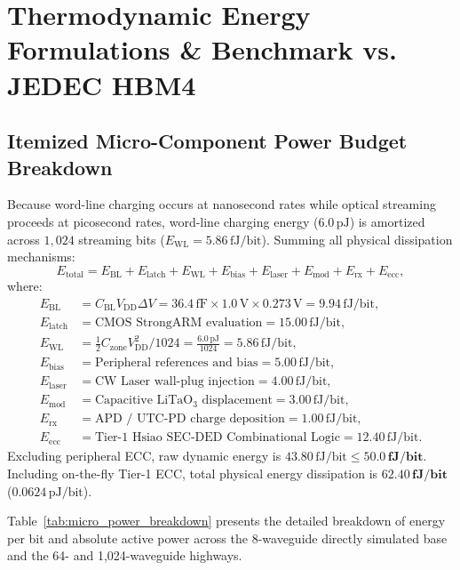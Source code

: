 \documentclass[journal]{IEEEtran}
\begin{document}
\section{Thermodynamic Energy Formulations \& Benchmark vs. JEDEC HBM4}
\label{sec:energy_hbm4}

\subsection{Itemized Micro-Component Power Budget Breakdown}
Because word-line charging occurs at nanosecond rates while optical streaming proceeds at picosecond rates, word-line charging energy ($6.0\,\text{pJ}$) is amortized across $1,024$ streaming bits ($E_{\text{WL}} = 5.86\,\text{fJ/bit}$). Summing all physical dissipation mechanisms:
\begin{equation}
    E_{\text{total}} = E_{\text{BL}} + E_{\text{latch}} + E_{\text{WL}} + E_{\text{bias}} + E_{\text{laser}} + E_{\text{mod}} + E_{\text{rx}} + E_{\text{ecc}},
\end{equation}
where:
\begin{align}
    E_{\text{BL}} &= C_{\text{BL}} V_{\text{DD}} \Delta V = 36.4\,\text{fF} \times 1.0\,\text{V} \times 0.273\,\text{V} = 9.94\,\text{fJ/bit}, \\
    E_{\text{latch}} &= \text{CMOS StrongARM evaluation} = 15.00\,\text{fJ/bit}, \\
    E_{\text{WL}} &= \frac{1}{2} C_{\text{zone}} V_{\text{DD}}^2 / 1024 = \frac{6.0\,\text{pJ}}{1024} = 5.86\,\text{fJ/bit}, \\
    E_{\text{bias}} &= \text{Peripheral references and bias} = 5.00\,\text{fJ/bit}, \\
    E_{\text{laser}} &= \text{CW Laser wall-plug injection} = 4.00\,\text{fJ/bit}, \\
    E_{\text{mod}} &= \text{Capacitive } \text{LiTaO}_3 \text{ displacement} = 3.00\,\text{fJ/bit}, \\
    E_{\text{rx}} &= \text{APD / UTC-PD charge deposition} = 1.00\,\text{fJ/bit}, \\
    E_{\text{ecc}} &= \text{Tier-1 Hsiao SEC-DED Combinational Logic} = 12.40\,\text{fJ/bit}.
\end{align}
Excluding peripheral ECC, raw dynamic energy is $43.80\,\text{fJ/bit} \le \mathbf{50.0\,\text{fJ/bit}}$. Including on-the-fly Tier-1 ECC, total physical energy dissipation is $\mathbf{62.40\,\text{fJ/bit}}$ ($0.0624\,\text{pJ/bit}$).

Table~\ref{tab:micro_power_breakdown} presents the detailed breakdown of energy per bit and absolute active power across the 8-waveguide directly simulated base and the 64- and 1,024-waveguide highways.
\end{document}
